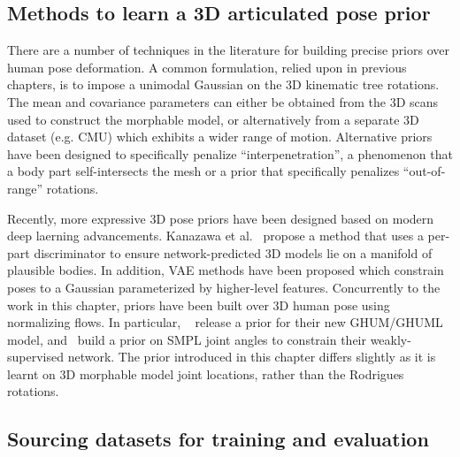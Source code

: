 \subsection{Methods to learn a 3D articulated pose prior}


There are a number of techniques in the literature for building precise priors over human pose deformation. A common formulation, relied upon in previous chapters, is to impose a unimodal Gaussian on the 3D kinematic tree rotations. The mean and covariance parameters can either be obtained from the 3D scans used to construct the morphable model, or alternatively from a separate 3D dataset (e.g. CMU) which exhibits a wider range of motion. Alternative priors have been designed to specifically penalize ``interpenetration'', a phenomenon that a body part self-intersects the mesh or a prior that specifically penalizes ``out-of-range'' rotations. 

Recently, more expressive 3D pose priors have been designed based on modern deep laerning advancements. Kanazawa et al.~\cite{xxx} propose a method that uses a per-part discriminator to ensure network-predicted 3D models lie on a manifold of plausible bodies. In addition, VAE methods have been proposed which constrain poses to a Gaussian parameterized by higher-level features. %
Concurrently to the work in this chapter, priors have been built over 3D human pose using normalizing flows. In particular, ~\citet{xu-2020-cvpr} release a prior for their new GHUM/GHUML model, and~\citet{weakly-supervised-normflow} build a prior on SMPL joint angles to constrain their weakly-supervised network. The prior introduced in this chapter differs slightly as it is learnt on 3D morphable model joint locations, rather than the Rodrigues rotations.





\subsection{Sourcing datasets for training and evaluation}

